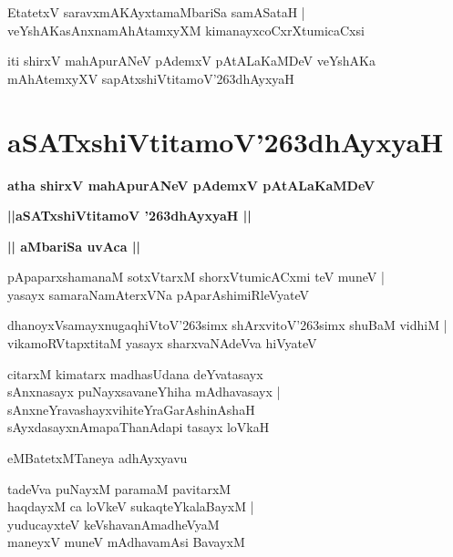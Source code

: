 \documentclass[twoside,12pt,openright]{book}
\def\S{\char'263}
\newcounter{shloka}[chapter]
\def\uvaca#1{\centerline{{\large\textbf{#1}}}}
\begin{document}
\begin{shloka}%
EtatetxV saravxmAKAyxtamaMbariSa samASataH |\\
veYshAKasAnxnamAhAtamxyXM kimanayxcoCxrXtumicaCxsi
\end{shloka}

\begin{center}
iti shirxV mahApurANeV pAdemxV pAtALaKaMDeV veYshAKa mAhAtemxyXV 
sapAtxshiVtitamoV\S dhAyxyaH
\end{center}

\chapter{aSATxshiVtitamoV\S dhAyxyaH}

\begin{center}
{\LARGE\bfseries atha shirxV mahApurANeV pAdemxV pAtALaKaMDeV }
\end{center}

\begin{center}         
{\LARGE\bfseries ||aSATxshiVtitamoV \S dhAyxyaH ||}
\end{center}

\uvaca{|| aMbariSa uvAca ||}

\begin{shloka}%
pApaparxshamanaM sotxVtarxM shorxVtumicACxmi teV muneV |\\
yasayx samaraNamAterxVNa pAparAshimiRleVyateV 
\end{shloka}

\begin{shloka}%
dhanoyxVsamayxnugaqhiVtoV\S simx shArxvitoV\S simx shuBaM vidhiM |\\
vikamoRVtapxtitaM yasayx sharxvaNAdeVva hiVyateV
\end{shloka}

\begin{shloka}%
citarxM kimatarx madhasUdana deYvatasayx \\
sAnxnasayx puNayxsavaneYhiha mAdhavasayx |\\
sAnxneYravashayxvihiteYraGarAshinAshaH \\
sAyxdasayxnAmapaThanAdapi tasayx loVkaH
\end{shloka}

\begin{center}
eMBatetxMTaneya adhAyxyavu
\end{center}
 
\begin{shloka}%
tadeVva puNayxM paramaM pavitarxM \\
haqdayxM ca loVkeV sukaqteYkalaBayxM |\\
yuducayxteV keVshavanAmadheVyaM \\
maneyxV muneV mAdhavamAsi BavayxM
\end{shloka}
\end{document}
